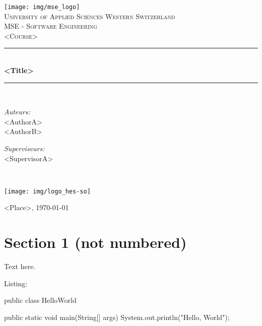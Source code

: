 \documentclass[a4paper,11pt]{report}
\newcommand{\Ecole}{University of Applied Sciences Western Switzerland}
\newcommand{\Filiere}{MSE - Software Engineering}
\newcommand{\Cours}{<Course>}
\newcommand{\Titre}{<Title>}
\newcommand{\Lieu}{<Place>}
\newcommand{\ReferentA}{<SupervisorA>}
\newcommand{\PartA}{<AuthorA>}
\newcommand{\PartB}{<AuthorB>}
\newcommand{\Parts}{\PartA \\ \PartB}
\newcommand{\Referents}{\ReferentA}
\newcommand{\HRule}{\rule{\linewidth}{0.5mm}}
\begin{document}
\begin{titlepage}
    \begin{center}

        \texttt{[image: img/mse\_logo]}~\\[1.5cm]
        \textsc{\Large \Ecole}\\[0.25cm]
        \textsc{\large \Filiere}\\[1.5cm]
        \textsc{\Large \Cours}\\[0.5cm]

        \HRule \\[0.4cm]
        { \huge \bfseries \Titre\\[0.4cm] }
        \HRule \\[1.5cm]

        \begin{minipage}[t]{0.4\textwidth}
            \begin{flushleft} \large
                \emph{Auteurs:}\\ \Parts
            \end{flushleft}
        \end{minipage}
        \begin{minipage}[t]{0.4\textwidth}
            \begin{flushright} \large
                \emph{Superviseurs:}\\\Referents
            \end{flushright}
        \end{minipage}~\\[1.5cm]

        \begin{center}
            \texttt{[image: img/logo\_hes-so]}
        \end{center}

        \vfill

        {\large \Lieu, \today}

    \end{center}
\end{titlepage}

\section*{Section 1 (not numbered)}

Text here.

Listing:

\begin{javacode}
public class HelloWorld {

    public static void main(String[] args) {
        System.out.println("Hello, World");
    }

}
\end{javacode}
\end{document}
